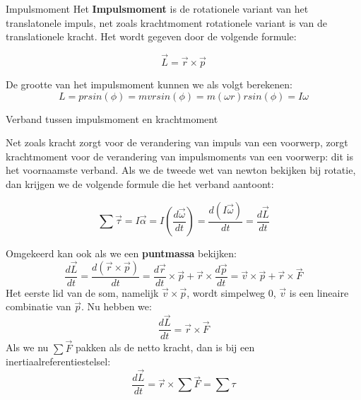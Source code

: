 \begin{theo}[Impulsmoment]{Impulsmoment}
     Het \textbf{Impulsmoment} is de rotationele variant van het translatonele impuls, net zoals krachtmoment rotationele variant is van de translationele kracht. Het wordt gegeven door de volgende formule:
    
     \begin{equation*}
         \Vec{L} = \Vec{r} \times \Vec{p}
     \end{equation*}

     \noindent De grootte van het impulsmoment kunnen we als volgt berekenen:
     \begin{equation*}
         L = prsin(\phi) = mvrsin(\phi) = m(\omega r)rsin(\phi) = I\omega
     \end{equation*}
     \vspace{-0.5cm}
\end{theo}

\begin{app}{Verband tussen impulsmoment en krachtmoment}

    Net zoals kracht zorgt voor de verandering van impuls van een voorwerp, zorgt krachtmoment voor de verandering van impulsmoments van een voorwerp: dit is het voornaamste verband. Als we de tweede wet van newton bekijken bij rotatie, dan krijgen we de volgende formule die het verband aantoont:
    
    \begin{equation*}
        \sum \Vec{\tau} = I\Vec{\alpha} = I(\dfrac{d\Vec{\omega}}{dt}) = \dfrac{d(I\Vec{\omega})}{dt} = \dfrac{d\Vec{L}}{dt}
    \end{equation*}

    \noindent Omgekeerd kan ook als we een \textbf{puntmassa} bekijken:
    \begin{equation*}
        \dfrac{d\Vec{L}}{dt} = \dfrac{d(\Vec{r} \times \Vec{p})}{dt} = \dfrac{d\Vec{r}}{dt} \times \Vec{p} + \Vec{r} \times \dfrac{d\Vec{p}}{dt} = \Vec{v} \times \Vec{p} + \Vec{r} \times \Vec{F}
    \end{equation*}
    \noindent Het eerste lid van de som, namelijk $ \Vec{v} \times \Vec{p} $, wordt simpelweg 0, $ \Vec{v} $ is een lineaire combinatie van $ \Vec{p} $. Nu hebben we:
    \begin{equation*}
        \dfrac{d\Vec{L}}{dt} = \Vec{r} \times \Vec{F}
    \end{equation*}
    \noindent Als we nu $ \sum \Vec{F} $ pakken als de netto kracht, dan is bij een inertiaalreferentiestelsel:
    \begin{equation*}
       \dfrac{d\Vec{L}}{dt} = \Vec{r} \times \sum \Vec{F} = \sum \tau
    \end{equation*}
    \vspace{-0.5cm}
\end{app}

